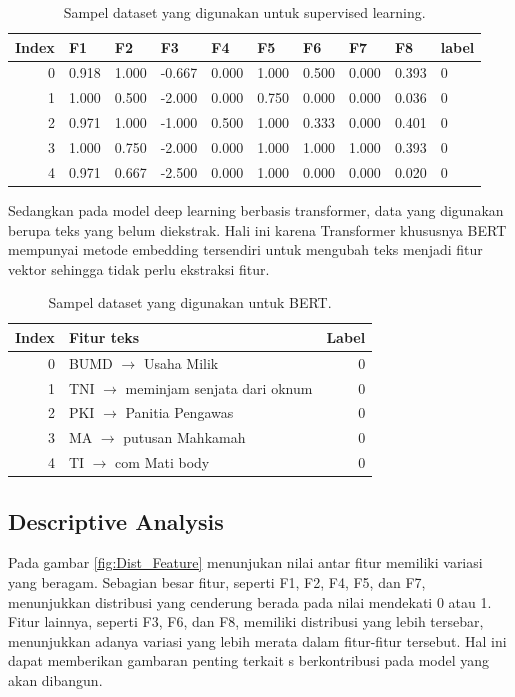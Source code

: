 \documentclass{article}\usepackage{float}
\begin{document}
\begin{table}
\centering
\begin{tabular}{r|*{9}{l}}
Index & F1 & F2 & F3 & F4 & F5 & F6 & F7 & F8 & label \\ \midrule
0 & 0.918 & 1.000 & -0.667 & 0.000 & 1.000 & 0.500 & 0.000 & 0.393 & 0 \\
1 & 1.000 & 0.500 & -2.000 & 0.000 & 0.750 & 0.000 & 0.000 & 0.036 & 0 \\
2 & 0.971 & 1.000 & -1.000 & 0.500 & 1.000 & 0.333 & 0.000 & 0.401 & 0 \\
3 & 1.000 & 0.750 & -2.000 & 0.000 & 1.000 & 1.000 & 1.000 & 0.393 & 0 \\
4 & 0.971 & 0.667 & -2.500 & 0.000 & 1.000 & 0.000 & 0.000 & 0.020 & 0 \\
\bottomrule
\end{tabular}
\caption{\label{tab:data} Sampel dataset yang digunakan untuk supervised learning.}
\end{table}



Sedangkan pada model deep learning berbasis transformer, data yang digunakan berupa teks yang belum diekstrak. Hali ini karena Transformer khususnya BERT mempunyai metode embedding tersendiri untuk mengubah teks menjadi fitur vektor sehingga tidak perlu ekstraksi fitur.

\begin{table}
\centering
\begin{tabular}{r|l|r}
\toprule
Index & Fitur teks & Label \\ \midrule
0 & BUMD $\rightarrow$ Usaha Milik & 0 \\
1 & TNI $\rightarrow$ meminjam senjata dari oknum & 0 \\
2 & PKI $\rightarrow$ Panitia Pengawas & 0 \\
3 & MA $\rightarrow$ putusan Mahkamah & 0 \\
4 & TI $\rightarrow$ com Mati body & 0 \\ \bottomrule
\end{tabular}
\caption{\label{tab:text_features}Sampel dataset yang digunakan untuk BERT.}
\end{table}

\subsection{Descriptive Analysis }

Pada gambar \ref{fig:Dist_Feature} menunjukan  nilai antar fitur memiliki variasi yang beragam. Sebagian besar fitur, seperti F1, F2, F4, F5, dan F7, menunjukkan distribusi yang cenderung berada pada nilai mendekati 0 atau 1. Fitur lainnya, seperti F3, F6, dan F8, memiliki distribusi yang lebih tersebar, menunjukkan adanya variasi yang lebih merata dalam fitur-fitur tersebut. Hal ini dapat memberikan gambaran penting terkait s berkontribusi pada model yang akan dibangun.
\end{document}

